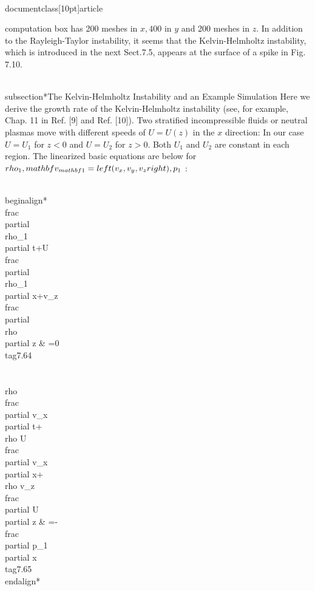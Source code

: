\\documentclass[10pt]{article}
\begin{document}
{{{{computation box has 200 meshes in $x, 400$ in $y$ and 200 meshes in $z$. In addition to the Rayleigh-Taylor instability, it seems that the Kelvin-Helmholtz instability, which is introduced in the next Sect.7.5, appears at the surface of a spike in Fig. 7.10.

\\subsection*{The Kelvin-Helmholtz Instability and an Example Simulation}
Here we derive the growth rate of the Kelvin-Helmholtz instability (see, for example, Chap. 11 in Ref. [9] and Ref. [10]). Two stratified incompressible fluids or neutral plasmas move with different speeds of $U=U(z)$ in the $x$ direction: In our case $U=U_{1}$ for $z<0$ and $U=U_{2}$ for $z>0$. Both $U_{1}$ and $U_{2}$ are constant in each region. The linearized basic equations are below for $\\rho_{1}, \\mathbf{v}_{\\mathbf{1}}=\\left(v_{x}, v_{y}, v_{z}\\right), p_{1}$ :


\\begin{align*}
\\frac{\\partial \\rho_{1}}{\\partial t}+U \\frac{\\partial \\rho_{1}}{\\partial x}+v_{z} \\frac{\\partial \\rho}{\\partial z} & =0  \\tag{7.64}\\\\
\\rho \\frac{\\partial v_{x}}{\\partial t}+\\rho U \\frac{\\partial v_{x}}{\\partial x}+\\rho v_{z} \\frac{\\partial U}{\\partial z} & =-\\frac{\\partial p_{1}}{\\partial x} \\tag{7.65}
\\end{align*}



}}}}
\end{document}
